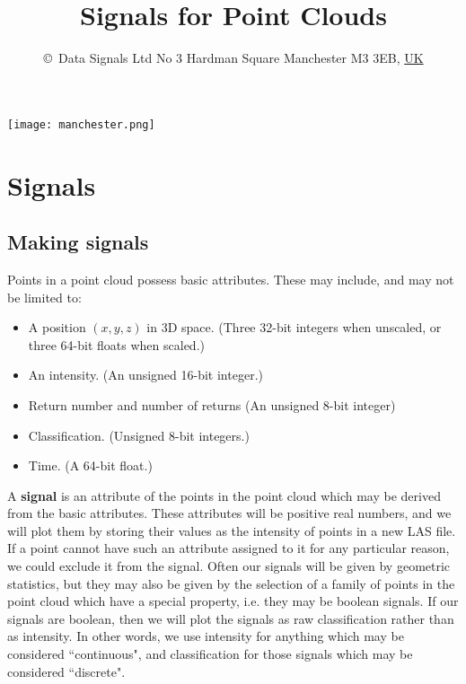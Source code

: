 \documentclass[a4paper,11pt,twoside]{article}
\theoremstyle{definition}
\theoremstyle{remark}
\begin{document}
\title{\textbf{Signals for Point Clouds}}
\author{\copyright\ Data Signals Ltd No 3 Hardman Square Manchester M3 3EB, \underline{UK}
}
\date{}
\maketitle
\texttt{[image: manchester.png]}
\newpage
\tableofcontents
\lstset{language=Python, 
        basicstyle=\ttfamily\small, 
        breaklines = true
}
\newpage
\section{Signals} 
\subsection{Making signals}
Points in a point cloud possess basic attributes. These may include, and may not be limited to:
\begin{itemize}
\item A position $(x,y,z)$ in 3D space. (Three 32-bit integers when unscaled, or three 64-bit floats when scaled.)
\item An intensity. (An unsigned 16-bit integer.)
\item Return number and number of returns (An unsigned 8-bit integer)
\item Classification. (Unsigned 8-bit integers.)
\item Time. (A 64-bit float.)
\end{itemize}
A \textbf{signal} is an attribute of the points in the point cloud which may be derived from the basic attributes. These attributes will be positive real numbers, and we will plot them by storing their values as the intensity of points in a new LAS file. If a point cannot have such an attribute assigned to it for any particular reason, we could exclude it from the signal. Often our signals will be given by geometric statistics, but they may also be given by the selection of a family of points in the point cloud which have a special property, i.e. they may be boolean signals. If our signals are boolean, then we will plot the signals as raw classification rather than as intensity. In other words, we use intensity for anything which may be considered ``continuous", and classification for those signals which may be considered ``discrete".
\end{document}
